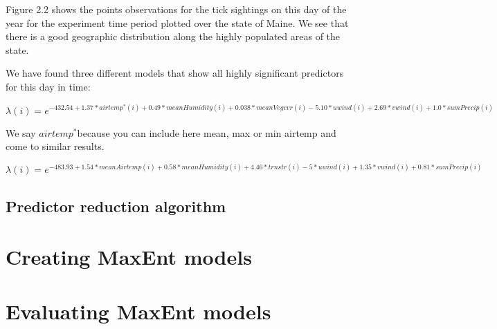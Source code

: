 \noindent Figure 2.2 shows the points observations for the tick sightings on this day of the year for the experiment time period plotted over the state of Maine. We see that there is a good geographic distribution along the highly populated areas of the state. \newline

\noindent We have found three different models that show all highly significant predictors for this day in time:

\begin{equation}
\lambda(i) = e^{-432.54 + 1.37*airtemp^*(i) + 0.49*meanHumidity(i) + 0.038*meanVegcvr(i) - 5.10*uwind(i) + 2.69*vwind(i) + 1.0*sumPrecip(i) }
\end{equation}

\noindent We say $airtemp^* $because you can include here mean, max or min airtemp and come to similar results.


\begin{equation}
\lambda(i) = e^{-483.93 + 1.54*meanAirtemp(i) + 0.58*meanHumidity(i) + 4.46*trnstr(i) - 5*uwind(i) + 1.35*vwind(i) + 0.81*sumPrecip(i) }
\end{equation}
\newline

\subsection{ Predictor reduction algorithm}


\section{Creating MaxEnt models}

\section{Evaluating MaxEnt models}

